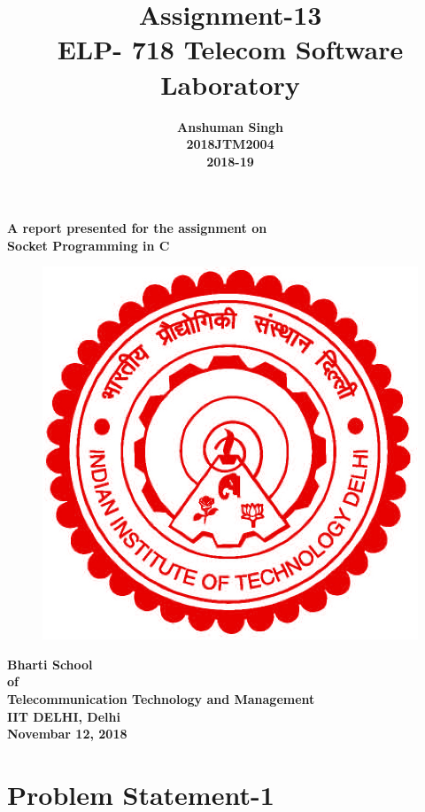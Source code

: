 \documentclass[12pt]{article}
\author{\textbf{Anshuman Singh} \\ \textbf{2018JTM2004}\\ \textbf{2018-19}}
\date{}
\title{\textbf{Assignment-13\\ELP- 718 Telecom Software Laboratory}}
\begin{document}
	\maketitle
	
	\begin{center}
	\noindent \textbf{A report presented for the assignment on\\ Socket Programming in C}
	\vspace{1cm}
	
	\begin{figure}[h]
	\centering
	\includegraphics[scale=.2]{iitd.jpg}
	
	
	\end{figure}
	\vspace{1.5cm}
	
	\textbf{Bharti School\\of\\Telecommunication Technology and Management\\IIT DELHI, Delhi\\Novembar 12, 2018}
	
	\end{center}
	
	\newpage
	\tableofcontents
	\listoffigures
	\newpage
	
	\section{Problem Statement-1}
	
\end{document}
